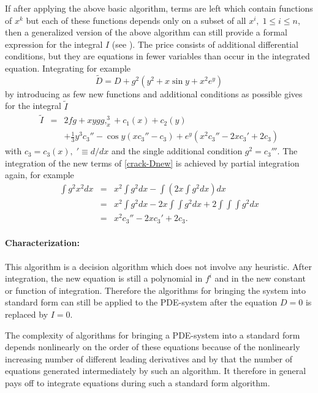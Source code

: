 If after applying the above basic algorithm, terms are left which
contain functions of $x^k$ but each of these functions depends only on
a subset of all $x^i, \; 1\leq i\leq n$, then a generalized version of
the above algorithm can still provide a formal expression for the
integral $I$ (see \cite{Wolf:2000}).  The price consists of additional
differential conditions, but they are equations in fewer variables
than occur in the integrated equation.  Integrating for example
\begin{equation}
\tilde{D} = D + g^2(y^2 + x\sin y + x^2e^y) \label{crack-Dnew}
\end{equation}
by introducing as few new functions and additional conditions as
possible gives for the integral $\tilde{I}$
\begin{eqnarray*}
\tilde{I} & = & 2fg + xygg,_{x}^{3} + c_1(x) + c_2(y) \\
          &   & + \frac{1}{3}y^3c_3'' - \cos y(xc_3'' - c_3)
+ e^y(x^2c_3'' - 2xc_3' + 2c_3)
\end{eqnarray*}
with $c_3 = c_3(x), \; '\equiv d/dx$ and the single additional
condition $g^2 = c_3'''$.  The integration of the new terms of
\eqref{crack-Dnew} is achieved by partial integration again, for
example
\begin{eqnarray*}
\int g^2x^2 dx & = & x^2\int g^2 dx - \int (2x\!\int g^2 dx) dx \\
              & = & x^2\int g^2 dx - 2x\int\!\!\int g^2 dx
                    + 2 \int\!\!\int\!\!\int g^2 dx \\
              & = & x^2c_3'' - 2xc_3' + 2c_3.
\end{eqnarray*}

\paragraph*{Characterization:}

This algorithm is a decision algorithm which does not involve any
heuristic.  After integration, the new equation is still a polynomial
in $f^i$ and in the new constant or function of integration.
Therefore the algorithms for bringing the system into standard form
can still be applied to the PDE-system after the equation $D = 0$ is
replaced by $I = 0$.

The complexity of algorithms for bringing a PDE-system into a standard
form depends nonlinearly on the order of these equations because of
the nonlinearly increasing number of different leading derivatives and
by that the number of equations generated intermediately by such an
algorithm.  It therefore in general pays off to integrate equations
during such a standard form algorithm.

